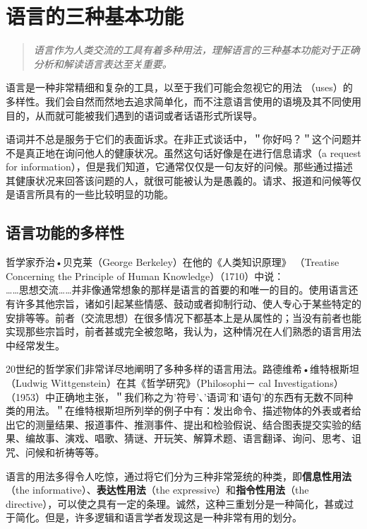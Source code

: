 \section{语言的三种基本功能}

\begin{quotation}
\textit{语言作为人类交流的工具有着多种用法，理解语言的三种基本功能对于正确分析和解读语言表达至关重要。}
\end{quotation}

语言是一种非常精细和复杂的工具，以至于我们可能会忽视它的用法 （uses）的多样性。我们会自然而然地去追求简单化，而不注意语言使用的语境及其不同使用目的，从而就可能被我们遇到的语词或者话语形式所误导。

语词并不总是服务于它们的表面诉求。在非正式谈话中，＂你好吗？＂这个问题并不是真正地在询问他人的健康状况。虽然这句话好像是在进行信息请求（a request for information），但是我们知道，它通常仅仅是一句友好的问候。那些通过描述其健康状况来回答该问题的人，就很可能被认为是愚義的。请求、报道和问候等仅是语言所具有的一些比较明显的功能。

\subsection{语言功能的多样性}

哲学家乔治•贝克莱（George Berkeley）在他的《人类知识原理》 （Treatise Concerning the Principle of Human Knowledge）（1710）中说：\\
……思想交流……并非像通常想象的那样是语言的首要的和唯一的目的。使用语言还有许多其他宗旨，诸如引起某些情感、鼓动或者抑制行动、使人专心于某些特定的安排等等。前者（交流思想）在很多情况下都基本上是从属性的；当没有前者也能实现那些宗旨时，前者甚或完全被忽略，我认为，这种情况在人们熟悉的语言用法中经常发生。

20世纪的哲学家们非常详尽地阐明了多种多样的语言用法。路德维希•维特根斯坦（Ludwig Wittgenstein）在其《哲学研究》（Philosophi－ cal Investigations）（1953）中正确地主张，＂我们称之为'符号'、'语词'和'语句'的东西有无数不同种类的用法。＂在维特根斯坦所列举的例子中有：发出命令、描述物体的外表或者给出它的测量结果、报道事件、推测事件、提出和检验假说、结合图表提交实验的结果、编故事、演戏、唱歌、猜谜、开玩笑、解算术题、语言翻译、询问、思考、诅咒、问候和祈祷等等。

语言的用法多得令人吃惊，通过将它们分为三种非常笼统的种类，即\textbf{信息性用法}（the informative）、\textbf{表达性用法}（the expressive）和\textbf{指令性用法}（the directive），可以使之具有一定的条理。诚然，这种三重划分是一种简化，甚或过于简化。但是，许多逻辑和语言学者发现这是一种非常有用的划分。

